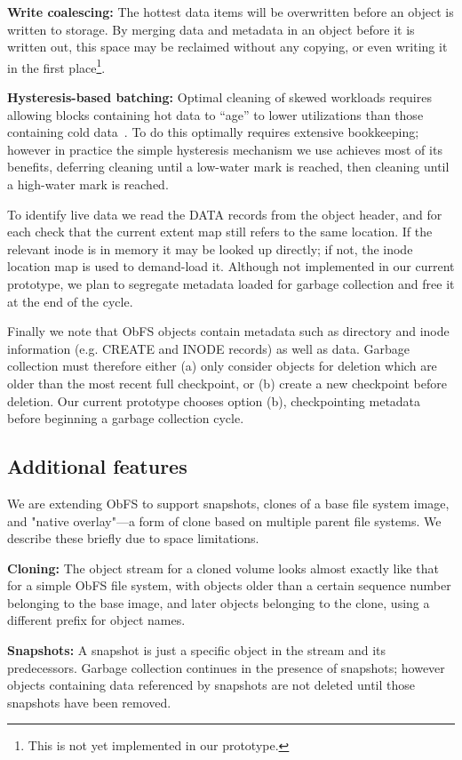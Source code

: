 \textbf{Write coalescing:} The hottest data items will be overwritten before an object is written to storage.
  By merging data and metadata in an object before it is written out, this space may be reclaimed without any copying, or even writing it in the first place\footnote{This is not yet implemented in our prototype.}.

\textbf{Hysteresis-based batching:} Optimal cleaning of skewed workloads requires allowing blocks containing hot data to ``age'' to lower utilizations than those containing cold data~\cite{desnoyers_analytic_2014}.
  To do this optimally requires extensive bookkeeping; however in practice the simple hysteresis mechanism we use achieves most of its benefits, deferring cleaning until a low-water mark is reached, then cleaning until a high-water mark is reached.

To identify live data we read the DATA records from the object header, and for each check that the current extent map still refers to the same location.
If the relevant inode is in memory it may be looked up directly; if not, the inode location map is used to demand-load it.
Although not implemented in our current prototype, we plan to segregate metadata loaded for garbage collection and free it at the end of the cycle.

Finally we note that ObFS objects contain metadata such as directory and inode information (e.g. CREATE and INODE records) as well as data.
Garbage collection must therefore either (a) only consider objects for deletion which are older than the most recent full checkpoint, or (b) create a new checkpoint before deletion.
Our current prototype chooses option (b), checkpointing metadata before beginning a garbage collection cycle.

\subsection{Additional features}
We are extending ObFS to support snapshots, clones of a base file system image, and "native overlay"---a form of clone based on multiple parent file systems.
We describe these briefly due to space limitations.

\noindent \textbf{Cloning:} The object stream for a cloned volume looks almost exactly like that for a simple ObFS file system, with objects older than a certain sequence number belonging to the base image, and later objects belonging to the clone, using a different prefix for object names.

\noindent \textbf{Snapshots:} A snapshot is just a specific object in the stream and its predecessors.
Garbage collection continues in the presence of snapshots; however objects containing data referenced by snapshots are not deleted until those snapshots have been removed.

